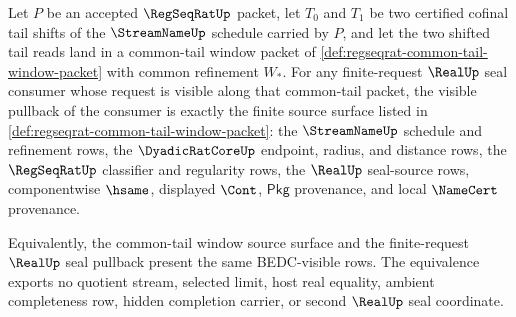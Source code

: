\begin{theorem}
\label{thm:regseqrat-common-tail-finite-request-real-seal-pullback}
Let $P$ be an accepted $\RegSeqRatUp$ packet, let $T_0$ and $T_1$ be two certified cofinal tail shifts of the $\StreamNameUp$ schedule carried by $P$, and let the two shifted tail reads land in a common-tail window packet of \autoref{def:regseqrat-common-tail-window-packet} with common refinement $W_\ast$. For any finite-request $\RealUp$ seal consumer whose request is visible along that common-tail packet, the visible pullback of the consumer is exactly the finite source surface listed in \autoref{def:regseqrat-common-tail-window-packet}: the $\StreamNameUp$ schedule and refinement rows, the $\DyadicRatCoreUp$ endpoint, radius, and distance rows, the $\RegSeqRatUp$ classifier and regularity rows, the $\RealUp$ seal-source rows, componentwise $\hsame$, displayed $\Cont$, $\mathsf{Pkg}$ provenance, and local $\NameCert$ provenance.

Equivalently, the common-tail window source surface and the finite-request $\RealUp$ seal pullback present the same BEDC-visible rows. The equivalence exports no quotient stream, selected limit, host real equality, ambient completeness row, hidden completion carrier, or second $\RealUp$ seal coordinate.
\end{theorem}

